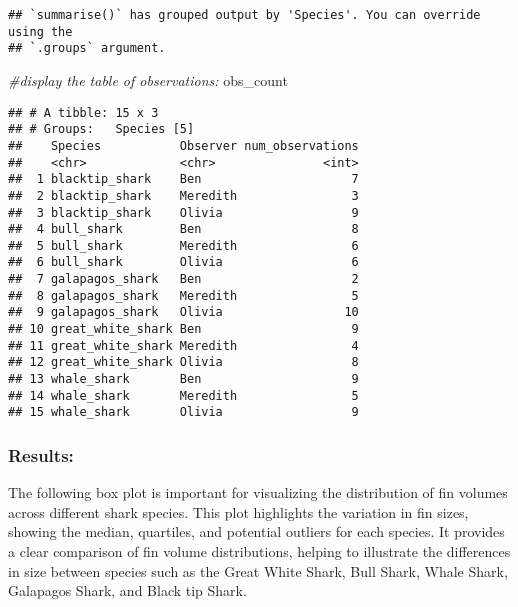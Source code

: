 \documentclass[
]{article}
\newenvironment{Shaded}{\begin{snugshade}}{\end{snugshade}}
\newcommand{\CommentTok}[1]{\textcolor[rgb]{0.56,0.35,0.01}{\textit{#1}}}
\newcommand{\NormalTok}[1]{#1}
\begin{document}
\begin{verbatim}
## `summarise()` has grouped output by 'Species'. You can override using the
## `.groups` argument.
\end{verbatim}

\begin{Shaded}
\begin{Highlighting}[]
\CommentTok{\#display the table of observations: }
\NormalTok{obs\_count}
\end{Highlighting}
\end{Shaded}

\begin{verbatim}
## # A tibble: 15 x 3
## # Groups:   Species [5]
##    Species           Observer num_observations
##    <chr>             <chr>               <int>
##  1 blacktip_shark    Ben                     7
##  2 blacktip_shark    Meredith                3
##  3 blacktip_shark    Olivia                  9
##  4 bull_shark        Ben                     8
##  5 bull_shark        Meredith                6
##  6 bull_shark        Olivia                  6
##  7 galapagos_shark   Ben                     2
##  8 galapagos_shark   Meredith                5
##  9 galapagos_shark   Olivia                 10
## 10 great_white_shark Ben                     9
## 11 great_white_shark Meredith                4
## 12 great_white_shark Olivia                  8
## 13 whale_shark       Ben                     9
## 14 whale_shark       Meredith                5
## 15 whale_shark       Olivia                  9
\end{verbatim}

\subsubsection{Results:}\label{results}

The following box plot is important for visualizing the distribution of
fin volumes across different shark species. This plot highlights the
variation in fin sizes, showing the median, quartiles, and potential
outliers for each species. It provides a clear comparison of fin volume
distributions, helping to illustrate the differences in size between
species such as the Great White Shark, Bull Shark, Whale Shark,
Galapagos Shark, and Black tip Shark.
\end{document}
